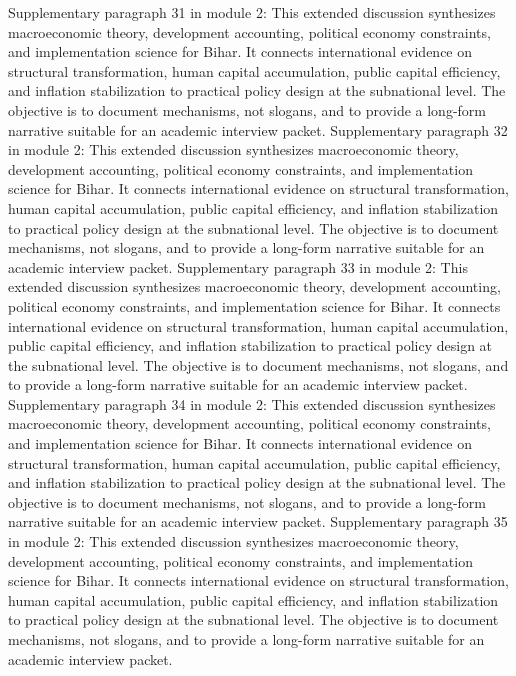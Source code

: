 \documentclass[preprint,12pt]{elsarticle}
\begin{document}
Supplementary paragraph 31 in module 2: This extended discussion synthesizes macroeconomic theory, development accounting, political economy constraints, and implementation science for Bihar. It connects international evidence on structural transformation, human capital accumulation, public capital efficiency, and inflation stabilization to practical policy design at the subnational level. The objective is to document mechanisms, not slogans, and to provide a long-form narrative suitable for an academic interview packet.
Supplementary paragraph 32 in module 2: This extended discussion synthesizes macroeconomic theory, development accounting, political economy constraints, and implementation science for Bihar. It connects international evidence on structural transformation, human capital accumulation, public capital efficiency, and inflation stabilization to practical policy design at the subnational level. The objective is to document mechanisms, not slogans, and to provide a long-form narrative suitable for an academic interview packet.
Supplementary paragraph 33 in module 2: This extended discussion synthesizes macroeconomic theory, development accounting, political economy constraints, and implementation science for Bihar. It connects international evidence on structural transformation, human capital accumulation, public capital efficiency, and inflation stabilization to practical policy design at the subnational level. The objective is to document mechanisms, not slogans, and to provide a long-form narrative suitable for an academic interview packet.
Supplementary paragraph 34 in module 2: This extended discussion synthesizes macroeconomic theory, development accounting, political economy constraints, and implementation science for Bihar. It connects international evidence on structural transformation, human capital accumulation, public capital efficiency, and inflation stabilization to practical policy design at the subnational level. The objective is to document mechanisms, not slogans, and to provide a long-form narrative suitable for an academic interview packet.
Supplementary paragraph 35 in module 2: This extended discussion synthesizes macroeconomic theory, development accounting, political economy constraints, and implementation science for Bihar. It connects international evidence on structural transformation, human capital accumulation, public capital efficiency, and inflation stabilization to practical policy design at the subnational level. The objective is to document mechanisms, not slogans, and to provide a long-form narrative suitable for an academic interview packet.
\end{document}
